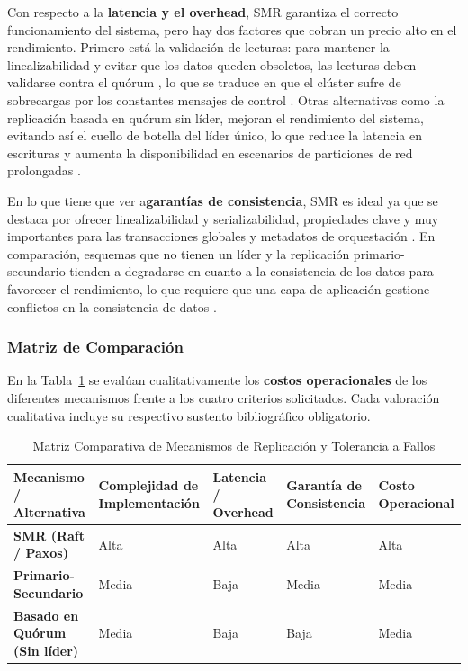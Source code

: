 \documentclass[12pt,letterpaper]{article}
\begin{document}
Con respecto a la \textbf{latencia y el overhead}, SMR garantiza el correcto funcionamiento del sistema, pero hay dos factores que cobran un precio alto en el rendimiento. Primero está la validación de lecturas: para mantener la linealizabilidad y evitar que los datos queden obsoletos, las lecturas deben validarse contra el quórum \cite{etcd2021}, lo que se traduce en que el clúster sufre de sobrecargas por los constantes mensajes de control \cite{cockroach2015}. Otras alternativas como la replicación basada en quórum sin líder, mejoran el rendimiento del sistema, evitando así el cuello de botella del líder único, lo que reduce la latencia en escrituras y aumenta la disponibilidad en escenarios de particiones de red prolongadas \cite{brooker2020}.

En lo que tiene que ver a\textbf{garantías de consistencia}, SMR es ideal ya que se destaca por ofrecer linealizabilidad y serializabilidad, propiedades clave y muy importantes para las transacciones globales \cite{srivastava2023} y metadatos de orquestación \cite{lebow2025}. En comparación, esquemas que no tienen un líder y la replicación primario-secundario tienden a degradarse en cuanto a la consistencia de los datos para favorecer el rendimiento, lo que requiere que una capa de aplicación gestione conflictos en la consistencia de datos \cite{brooker2020}. 

\subsubsection{Matriz de Comparación}
En la Tabla~\ref{tab:matriz_comparacion} se evalúan cualitativamente los \textbf{costos operacionales} de los diferentes mecanismos frente a los cuatro criterios solicitados. Cada valoración cualitativa incluye su respectivo sustento bibliográfico obligatorio.

\begin{table}[H]
\centering
\caption{Matriz Comparativa de Mecanismos de Replicación y Tolerancia a Fallos}
\label{tab:matriz_comparacion}
\renewcommand{\arraystretch}{1.4}
\small
\begin{tabular}{|p{3cm}|p{2.8cm}|p{2.8cm}|p{2.8cm}|p{2.8cm}|}
\hline
\textbf{Mecanismo / Alternativa} & \textbf{Complejidad de Implementación} & \textbf{Latencia / Overhead} & \textbf{Garantía de Consistencia} & \textbf{Costo Operacional} \\ \hline

\textbf{SMR (Raft / Paxos)} & 
Alta \cite{woos2016} \cite{liang2025} & 
Alta \cite{cockroach2015} \cite{etcd2021} & 
Alta \cite{srivastava2023} \cite{lebow2025} & 
Alta \cite{brooker2020} \\ \hline

\textbf{Primario-Secundario} & 
Media \cite{brooker2020} & 
Baja \cite{brooker2020} & 
Media \cite{brooker2020} & 
Media \cite{brooker2020} \\ \hline

\textbf{Basado en Quórum (Sin líder)} & 
Media \cite{brooker2020} & 
Baja \cite{brooker2020} & 
Baja \cite{srivastava2023} & 
Media \cite{brooker2020} \\ \hline
\end{tabular}
\end{table}
\end{document}
